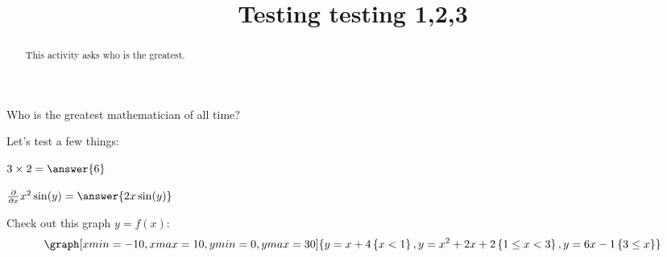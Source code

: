 \documentclass{ximera}
\title{Testing testing 1,2,3}
\begin{document}
      
\begin{abstract}
      
This activity asks who is the greatest.
      
\end{abstract}
      
\maketitle
      
      
      
\begin{question}
      
  Who is the greatest mathematician of all time?
      
  \begin{multipleChoice}
      
      
    



    
      
  \end{multipleChoice}
      
\end{question}      

Let's test a few things:

\begin{question}
 
$3\times 2 = \answer{6}$
 
\end{question}

\begin{question}
 
         $ \frac{\partial}{\partial x} x^2\sin(y) =  \answer{2x\sin(y)}$
 
    \end{question}


 \begin{onlineOnly}
   Check out this graph $y=f(x)$:
   \[
   \graph[xmin=-10,xmax=10,ymin=0,ymax=30]{y=x+4\left\{x<1\right\},y=x^2+2x+2\left\{1\leq x<3\right\},y=6x-1\left\{3 \leq x\right\}} 
   \]
 \end{onlineOnly}
\end{document}

